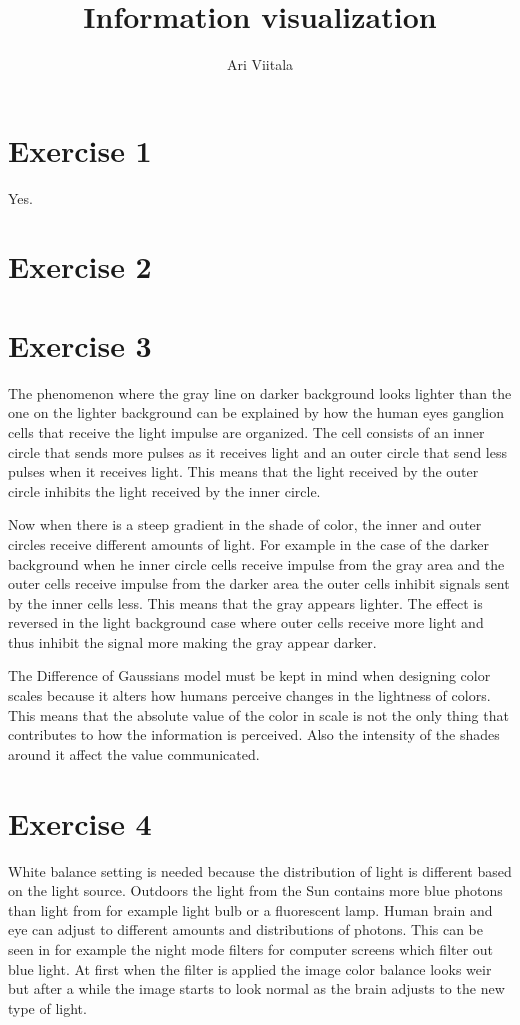 \documentclass{article}
\title{Information visualization}
\author{Ari Viitala}
\begin{document}
	\maketitle

\section*{Exercise 1}
Yes.
\section*{Exercise 2}

\section*{Exercise 3}

The phenomenon where the gray line on darker background looks lighter than the one on the lighter background can be explained by how the human eyes ganglion cells that receive the light impulse are organized. The cell consists of an inner circle that sends more pulses as it receives light and an outer circle that send less pulses when it receives light. This means that the light received by the outer circle inhibits the light received by the inner circle.

Now when there is a steep gradient in the shade of color, the inner and outer circles receive different amounts of light. For example in the case of the darker background when he inner circle cells receive impulse from the gray area and the outer cells receive impulse from the darker area the outer cells inhibit signals sent by the inner cells less. This means that the gray appears lighter. The effect is reversed in the light background case where outer cells receive more light and thus inhibit the signal more making the gray appear darker.

The Difference of Gaussians model must be kept in mind when designing color scales because it alters how humans perceive changes in the lightness of colors. This means that the absolute value of the color in scale is not the only thing that contributes to how the information is perceived. Also the intensity of the shades around it affect the value communicated.  

\section*{Exercise 4}

White balance setting is needed because the distribution of light is different based on the light source. Outdoors the light from the Sun contains more blue photons than light from for example light bulb or a fluorescent lamp. Human brain and eye can adjust to different amounts and distributions of photons. This can be seen in for example the night mode filters for computer screens which filter out blue light. At first when the filter is applied the image color balance looks weir but after a while the image starts to look normal as the brain adjusts to the new type of light.
\end{document}
